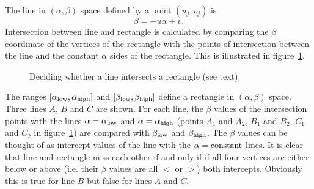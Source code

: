  The line in $(\alpha , \beta )$ space defined by a point $(u_j,v_j)$ is
 \[ \beta = - u \alpha + v. \]
 Intersection between line and rectangle is calculated by comparing the
 $\beta$ coordinate of the vertices of the rectangle with the points
 of intersection between the line and the constant $\alpha$
 sides of the rectangle. This is illustrated in figure~\ref{rect_intersect}.
 \begin{figure}
  \centerline{}
  \caption[Deciding whether a line intersects a rectangle.]
	  {Deciding whether a line intersects a rectangle (see text).}
  \label{rect_intersect}
 \end{figure}
 The ranges $[\alpha_{\rm low},\alpha_{\rm high}]$ and
 $[\beta_{\rm low},\beta_{\rm high}]$ define a rectangle in
 $(\alpha , \beta )$ space. Three lines $A$, $B$ and $C$ are shown.
 For each line, the $\beta$ values of the intersection points with the lines
 $\alpha = \alpha_{\rm low}$ and $\alpha = \alpha_{\rm high}$
 (points $A_1$ and $A_2$, $B_1$ and $B_2$, $C_1$ and $C_2$
 in figure~\ref{rect_intersect}) are compared with $\beta_{\rm low}$ and
 $\beta_{\rm high}$. The $\beta$ values can be thought of as intercept values
 of the line with the $\alpha = {\rm constant}$ lines.
 It is clear that line and rectangle miss each other if and only if
 if all four vertices are either below or above (i.e. their $\beta$ values
 are all $<$ or $>$) both intercepts. Obviously this is true for line $B$ but
 false for lines $A$ and $C$.

